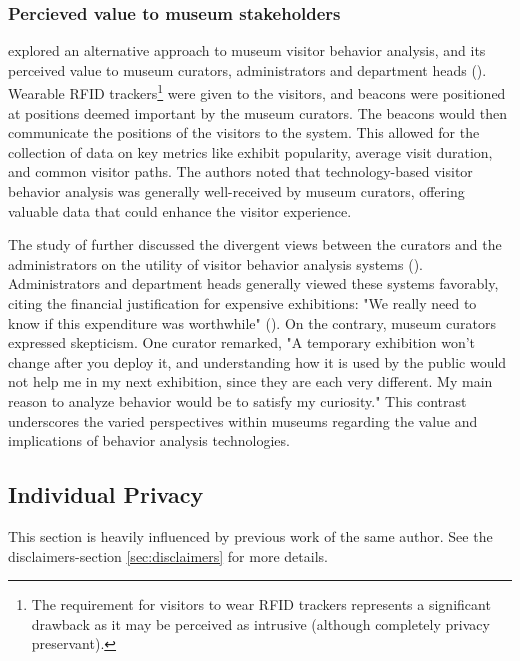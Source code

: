 \subsubsection{Percieved value to museum stakeholders}
\citeauthor{la2017museumbehaviouranalysis} explored an alternative approach to museum visitor behavior analysis, and its perceived value to museum curators, administrators and department heads (\citeyear{la2017museumbehaviouranalysis}). Wearable RFID trackers\footnote{The requirement for visitors to wear RFID trackers represents a significant drawback as it may be perceived as intrusive (although completely privacy preservant).} were given to the visitors, and beacons were positioned at positions deemed important by the museum curators. The beacons would then communicate the positions of the visitors to the system. This allowed for the collection of data on key metrics like exhibit popularity, average visit duration, and common visitor paths. The authors noted that technology-based visitor behavior analysis was generally well-received by museum curators, offering valuable data that could enhance the visitor experience.

The study of \citeauthor{la2017museumbehaviouranalysis} further discussed the divergent views between the curators and the administrators on the utility of visitor behavior analysis systems (\citeyear{la2017museumbehaviouranalysis}). Administrators and department heads generally viewed these systems favorably, citing the financial justification for expensive exhibitions: "We really need to know if this expenditure was worthwhile" (\cite{la2017museumbehaviouranalysis}). On the contrary, museum curators expressed skepticism. One curator remarked, "A temporary exhibition won’t change after you deploy it, and understanding how it is used by the public would not help me in my next exhibition, since they are each very different. My main reason to analyze behavior would be to satisfy my curiosity." This contrast underscores the varied perspectives within museums regarding the value and implications of behavior analysis technologies.

\subsection{Individual Privacy}
\label{sec:individual_privacy}

This section is heavily influenced by previous work of the same author. See the disclaimers-section \ref{sec:disclaimers} for more details.

